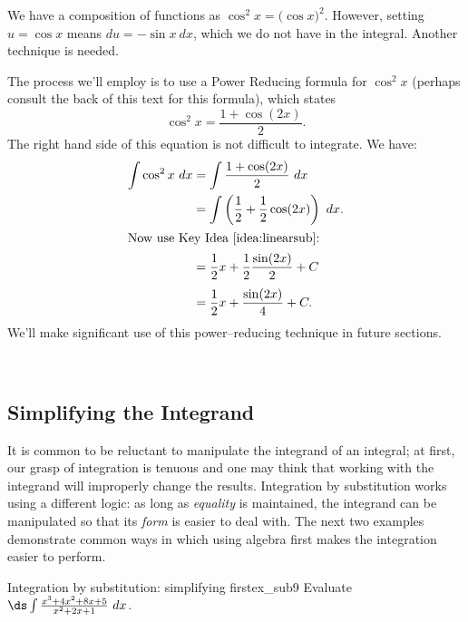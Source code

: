 \begin{solution}
{We have a composition of functions as $\cos^2x = \big(\cos x\big)^2$. 
However, setting $u = \cos x$ means $du = -\sin x\ dx$, which we do not have in the integral. Another technique is needed.

The process we'll employ is to use a Power Reducing formula for $\cos^2x$ (perhaps consult the back of this text for this formula), which states 
	$$\cos ^2x = \frac{1+\cos(2x)}{2}.$$
	The right hand side of this equation is not difficult to integrate. We have:
\begin{align*}
	\int \cos^2x\ dx &= \int \frac{1+\cos(2x)}2\ dx \\
									&=	\int \left( \frac12 + \frac12\cos(2x)\right)\ dx. \\
\intertext{Now use Key Idea \ref{idea:linearsub}:}
									&= \frac12x + \frac12\frac{\sin(2x)}{2} + C \rule[-10pt]{0pt}{5pt}\\
									&= \frac12x + \frac{\sin(2x)}4 + C.
\end{align*}
We'll make significant use of this power--reducing technique in future sections.
}\\
\end{solution}



\subsection{ Simplifying the Integrand}

It is common to be reluctant to manipulate the integrand of an integral; at first, our grasp of integration is tenuous and one may think that working with the integrand will improperly change the results. Integration by substitution works using a different logic: as long as \textit{equality} is maintained, the integrand can be manipulated so that its \textit{form} is easier to deal with. The next two examples demonstrate common ways in which using algebra first makes the integration easier to perform.\\


\begin{example}{Integration by substitution: simplifying first}{ex_sub9}
{
Evaluate $\ds\int \frac{x^3+4x^2+8x+5}{x^2+2x+1}\ dx$.}
\end{example}


